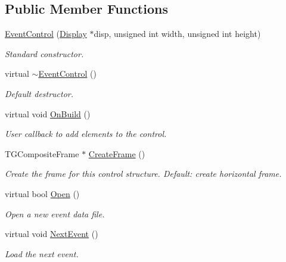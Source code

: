 \subsection*{Public Member Functions}
\begin{DoxyCompactItemize}
\item 
\hyperlink{class_d_d4hep_1_1_event_control_a5abad625ba8ddb768f2dff26ec06c987}{EventControl} (\hyperlink{class_d_d4hep_1_1_display}{Display} $\ast$disp, unsigned int width, unsigned int height)
\begin{DoxyCompactList}\small\item\em Standard constructor. \item\end{DoxyCompactList}\item 
virtual \hyperlink{class_d_d4hep_1_1_event_control_ad8fcc15169bd6829ac92497adf216b94}{$\sim$EventControl} ()
\begin{DoxyCompactList}\small\item\em Default destructor. \item\end{DoxyCompactList}\item 
virtual void \hyperlink{class_d_d4hep_1_1_event_control_ada9bb8f5e290f6acb6832208f407a53a}{OnBuild} ()
\begin{DoxyCompactList}\small\item\em User callback to add elements to the control. \item\end{DoxyCompactList}\item 
TGCompositeFrame $\ast$ \hyperlink{class_d_d4hep_1_1_event_control_a10479ca8f5f5836f6e3a9c1367eea1fb}{CreateFrame} ()
\begin{DoxyCompactList}\small\item\em Create the frame for this control structure. Default: create horizontal frame. \item\end{DoxyCompactList}\item 
virtual bool \hyperlink{class_d_d4hep_1_1_event_control_ac317c6010a8ee404fb90da3081a05d8d}{Open} ()
\begin{DoxyCompactList}\small\item\em Open a new event data file. \item\end{DoxyCompactList}\item 
virtual void \hyperlink{class_d_d4hep_1_1_event_control_ac176e09a639beea7cc010b5f66b7b129}{NextEvent} ()
\begin{DoxyCompactList}\small\item\em Load the next event. \item\end{DoxyCompactList}\item 

\end{DoxyCompactItemize}
